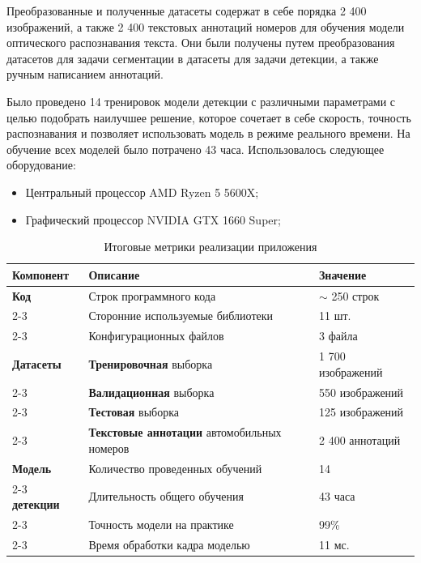 \documentclass[a4paper,12pt]{article}
\begin{document}
Преобразованные и полученные датасеты содержат в себе порядка 2 400 изображений, а также 2 400 текстовых аннотаций номеров для обучения модели оптического распознавания текста. Они были получены путем преобразования датасетов для задачи сегментации в датасеты для задачи детекции, а также ручным написанием аннотаций.

Было проведено 14 тренировок модели детекции с различными параметрами с целью подобрать наилучшее решение, которое сочетает в себе скорость, точность распознавания и позволяет использовать модель в режиме реального времени. На обучение всех моделей было потрачено 43 часа. Использовалось следующее оборудование:
\begin{itemize}
    \item Центральный процессор AMD Ryzen 5 5600X;
    \item Графический процессор NVIDIA GTX 1660 Super;
\end{itemize}

\begin{table}[H]
\centering
\begin{tabular}{|p{3cm}|p{7cm}|p{4cm}|}
\hline
\textbf{Компонент} & \textbf{Описание} & \textbf{Значение} \\
\hline
\textbf{Код} & Строк программного кода & $\sim$ 250 строк \\
\cline{2-3}
& Сторонние используемые библиотеки & 11 шт. \\
\cline{2-3}
& Конфигурационных файлов & 3 файла \\
\hline
\textbf{Датасеты} & \textbf{Тренировочная} выборка & 1 700 изображений \\
\cline{2-3}
& \textbf{Валидационная} выборка &  550 изображений \\
\cline{2-3}
& \textbf{Тестовая} выборка & 125 изображений \\
\cline{2-3}
&  \textbf{Текстовые аннотации} автомобильных номеров & 2 400 аннотаций \\
\hline
\textbf{Модель} & Количество проведенных обучений & 14 \\
\cline{2-3}
\textbf{детекции} & Длительность общего обучения & 43 часа \\
\cline{2-3}
& Точность модели на практике & 99\% \\
\cline{2-3}
& Время обработки кадра моделью & 11 мс. \\
\hline
\end{tabular}
\caption{Итоговые метрики реализации приложения}
\end{table}
\end{document}
